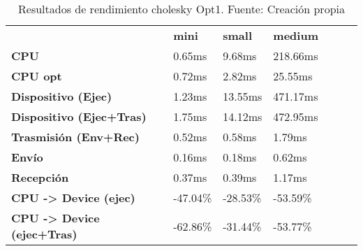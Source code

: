 \begin{table}[H]
    \centering
    \begin{tabular}{lllllll}
    \rowcolor[HTML]{DAE8FC} \ &  \textbf{mini} &  \textbf{	small} &  \textbf{	medium} \\
    \cellcolor[HTML]{DAE8FC} \textbf{CPU} & 0.65ms & 	9.68ms & 	218.66ms \\
    \rowcolor[HTML]{EFEFEF} \cellcolor[HTML]{DAE8FC} \textbf{CPU opt} & 0.72ms & 	2.82ms & 	25.55ms \\
    \cellcolor[HTML]{DAE8FC} \textbf{Dispositivo (Ejec)} & 1.23ms & 	13.55ms & 	471.17ms \\
    \rowcolor[HTML]{EFEFEF} \cellcolor[HTML]{DAE8FC} \textbf{Dispositivo (Ejec+Tras)} & 1.75ms & 	14.12ms & 	472.95ms \\
    \cellcolor[HTML]{DAE8FC} \textbf{Trasmisión (Env+Rec)} & 0.52ms & 	0.58ms & 	1.79ms \\
    \rowcolor[HTML]{EFEFEF} \cellcolor[HTML]{DAE8FC} \textbf{Envío} & 0.16ms & 	0.18ms & 	0.62ms \\
    \cellcolor[HTML]{DAE8FC} \textbf{Recepción} & 0.37ms & 	0.39ms & 	1.17ms \\
    \rowcolor[HTML]{EFEFEF} \cellcolor[HTML]{DAE8FC} \textbf{CPU -> Device (ejec)} & -47.04\% & 	-28.53\% & 	-53.59\% \\
    \cellcolor[HTML]{DAE8FC} \textbf{CPU -> Device (ejec+Tras)} & -62.86\% & 	-31.44\% & 	-53.77\% \\
    \end{tabular}
    \caption[Resultados de rendimiento cholesky Opt1]{{Resultados de rendimiento cholesky Opt1. Fuente: Creación propia}}
    \label{table_test_cholesky_Opt1_hw_performanceResults}
\end{table}